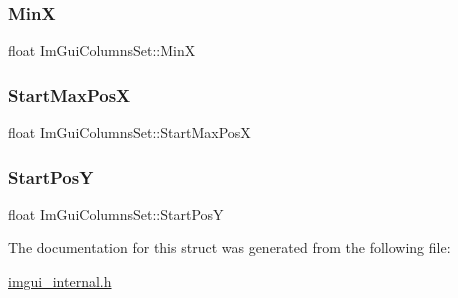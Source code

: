 \subsubsection{\texorpdfstring{MinX}{MinX}}
{\footnotesize\ttfamily float Im\+Gui\+Columns\+Set\+::\+MinX}

\mbox{\label{struct_im_gui_columns_set_a61470bb069a752930fc8a838e9f552d3}} 
\subsubsection{\texorpdfstring{Start\+Max\+PosX}{StartMaxPosX}}
{\footnotesize\ttfamily float Im\+Gui\+Columns\+Set\+::\+Start\+Max\+PosX}

\mbox{\label{struct_im_gui_columns_set_a32611b7e09fb2dbdcc5342fecc3a0f6c}} 
\subsubsection{\texorpdfstring{Start\+PosY}{StartPosY}}
{\footnotesize\ttfamily float Im\+Gui\+Columns\+Set\+::\+Start\+PosY}



The documentation for this struct was generated from the following file\+:\begin{DoxyCompactItemize}
\item 
\mbox{\hyperlink{imgui__internal_8h}{imgui\+\_\+internal.\+h}}\end{DoxyCompactItemize}
